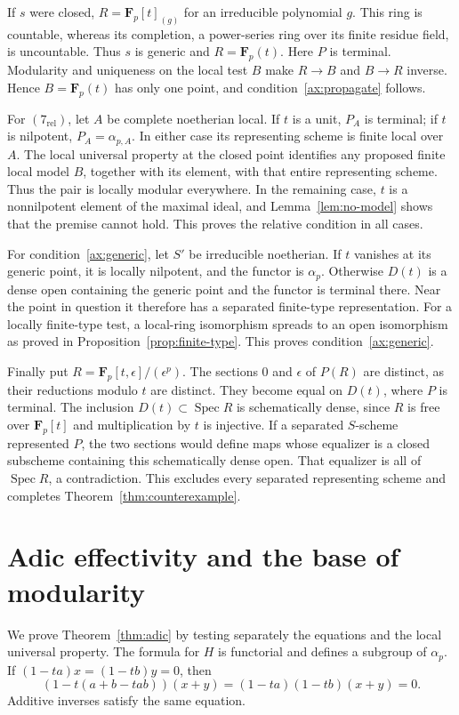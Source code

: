 \documentclass[11pt]{article}
\theoremstyle{definition}\newtheorem{definition}[theorem]{Definition}
\theoremstyle{remark}\newtheorem{remark}[theorem]{Remark}
\newcommand{\F}{\mathbf F}
\newcommand{\Spec}{\operatorname{Spec}}
\begin{document}
If $s$ were closed, $R=\F_p[t]_{(g)}$ for an irreducible polynomial $g$. This ring is countable, whereas its completion, a power-series ring over its finite residue field, is uncountable. Thus $s$ is generic and $R=\F_p(t)$. Here $P$ is terminal. Modularity and uniqueness on the local test $B$ make $R\to B$ and $B\to R$ inverse. Hence $B=\F_p(t)$ has only one point, and condition~\ref{ax:propagate} follows.

For $(7_{\mathrm{rel}})$, let $A$ be complete noetherian local. If $t$ is a unit, $P_A$ is terminal; if $t$ is nilpotent, $P_A=\alpha_{p,A}$. In either case its representing scheme is finite local over $A$. The local universal property at the closed point identifies any proposed finite local model $B$, together with its element, with that entire representing scheme. Thus the pair is locally modular everywhere. In the remaining case, $t$ is a nonnilpotent element of the maximal ideal, and Lemma~\ref{lem:no-model} shows that the premise cannot hold. This proves the relative condition in all cases.

For condition~\ref{ax:generic}, let $S'$ be irreducible noetherian. If $t$ vanishes at its generic point, it is locally nilpotent, and the functor is $\alpha_p$. Otherwise $D(t)$ is a dense open containing the generic point and the functor is terminal there. Near the point in question it therefore has a separated finite-type representation. For a locally finite-type test, a local-ring isomorphism spreads to an open isomorphism as proved in Proposition~\ref{prop:finite-type}. This proves condition~\ref{ax:generic}.

Finally put $R=\F_p[t,\epsilon]/(\epsilon^p)$. The sections $0$ and $\epsilon$ of $P(R)$ are distinct, as their reductions modulo $t$ are distinct. They become equal on $D(t)$, where $P$ is terminal. The inclusion $D(t)\subset\Spec R$ is schematically dense, since $R$ is free over $\F_p[t]$ and multiplication by $t$ is injective. If a separated $S$-scheme represented $P$, the two sections would define maps whose equalizer is a closed subscheme containing this schematically dense open. That equalizer is all of $\Spec R$, a contradiction. This excludes every separated representing scheme and completes Theorem~\ref{thm:counterexample}.

\section{Adic effectivity and the base of modularity}

We prove Theorem~\ref{thm:adic} by testing separately the equations and the local universal property. The formula for $H$ is functorial and defines a subgroup of $\alpha_p$. If $(1-ta)x=(1-tb)y=0$, then
\[
 (1-t(a+b-tab))(x+y)=(1-ta)(1-tb)(x+y)=0.
\]
Additive inverses satisfy the same equation.
\end{document}
